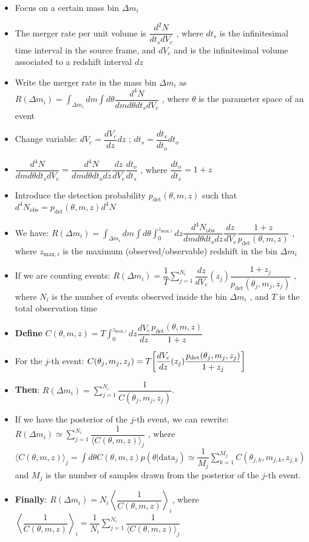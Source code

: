 \documentclass[12pt,a4paper]{article}
\begin{document}
\begin{itemize}
    \item Focus on a certain mass bin $\Delta m_i$
    \item The merger rate per unit volume is $\dfrac{d^2N}{dt_s dV_c}$ , where $dt_s$ is the infinitesimal time interval in the source frame, and $dV_c$ and is the infinitesimal volume associated to a redshift interval $dz$
    \item Write the merger rate in the mass bin $\Delta m_i$ as $R(\Delta m_i) = \int_{\Delta m_i} dm \int d\theta \dfrac{d^4N}{dm d\theta dt_s dV_c}$ , where $\theta$ is the parameter space of an event
    \item Change variable: $dV_c = \dfrac{dV_c}{dz} dz$ ; $dt_s = \dfrac{dt_s}{dt_o} dt_o$
    \item $\dfrac{d^4N}{dm d\theta dt_s dV_c} = \dfrac{d^4N}{dm d\theta dt_o dz} \dfrac{dz}{dV_c} \dfrac{dt_o}{dt_s}$ , where $\dfrac{dt_o}{dt_s} = 1+z$
    \item Introduce the detection probability $p_\text{det}(\theta, m ,z)$ such that $d^4N_\text{obs} = p_\text{det}(\theta, m ,z) d^4N$
    \item We have: $R(\Delta m_i) = \int_{\Delta m_i} dm \int d\theta \int_0^{z_{\text{max}, i}} dz \dfrac{d^4N_\text{obs}}{dm d\theta dt_o dz} \dfrac{dz}{dV_c} \dfrac{1+z}{p_\text{det}(\theta, m, z)}$ , where $z_{\text{max}, i}$ is the maximum (observed/observable) redshift in the bin $\Delta m_i$
    \item If we are counting events: $R(\Delta m_i) = \dfrac{1}{T} \sum_{j=1}^{N_i} \dfrac{dz}{dV_c}(z_j) \dfrac{1+z_j}{p_\text{det}(\theta_j, m_j, z_j)}$ , where $N_i$ is the number of events observed inside the bin $\Delta m_i$ , and $T$ is the total observation time
    \item \textbf{Define} $C(\theta, m, z) = T \int_0^{z_{\text{max}, i}} dz \dfrac{dV_c}{dz} \dfrac{p_\text{det}(\theta, m, z)}{1+z}$
    \item For the $j\text{-th}$ event: $C(\theta_j, m_j, z_j) = T \qty[\dfrac{dV_c}{dz}(z_j) \dfrac{p_\text{det}(\theta_j, m_j, z_j)}{1+z_j}]$
    \item \textbf{Then}: $R(\Delta m_i) = \sum_{j=1}^{N_i} \dfrac{1}{C(\theta_j, m_j, z_j)}$.
    \item If we have the posterior of the $j\text{-th}$ event, we can rewrite: $R(\Delta m_i) \simeq \sum_{j=1}^{N_i} \dfrac{1}{\langle C(\theta, m, z)\rangle_j}$ , where $\langle C(\theta, m, z)\rangle_j = \int d\theta C(\theta, m, z) p(\theta | \text{data}_j) \simeq \dfrac{1}{M_j} \sum_{k=1}^{M_j} C(\theta_{j, k}, m_{j, k}, z_{j, k})$ and $M_j$ is the number of samples drawn from the posterior of the $j\text{-th}$ event.
    \item \textbf{Finally}: $R(\Delta m_i) = N_i \left\langle \dfrac{1}{C(\theta, m, z)} \right\rangle_i$, where\\
    $\left\langle \dfrac{1}{C(\theta, m, z)} \right\rangle_i = \dfrac{1}{N_i} \sum_{j=1}^{N_i} \dfrac{1}{\langle C(\theta, m, z) \rangle_j}$
\end{itemize} 
\end{document}
